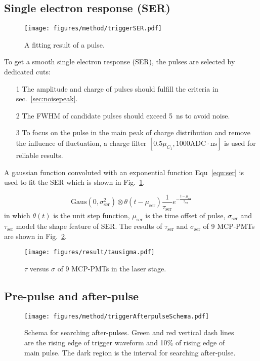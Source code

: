 \subsection{Single electron response (SER)}
\begin{figure}
    \centering
    \texttt{[image: figures/method/triggerSER.pdf]}
    \caption{A fitting result of a pulse.}
    \label{fig:triggerser}
\end{figure}
To get a smooth single electron response (SER), the pulses are selected by dedicated cuts:
\begin{itemize}
    \item[1] The amplitude and charge of pulses should fulfill the criteria in sec.~\ref{sec:noisepeak}.
    \item[2] The FWHM of candidate pulses should exceed \SI{5}{ns} to avoid noise.
    \item[3] To focus on the pulse in the main peak of charge distribution and remove the influence of fluctuation, a charge filter $[0.5\mu_{C_1}, 1000\mathrm{ADC\cdot ns}]$ is used for reliable results.
\end{itemize}

A gaussian function convoluted with an exponential function Equ~\eqref{equ:ser} is used to fit the SER which is shown in Fig.~\ref{fig:triggerser}.

\begin{equation}
    \label{equ:ser}
    \mathrm{Gaus}(0,\sigma_{\mathrm{ser}}^2)\otimes\theta(t-\mu_{\mathrm{ser}})\frac{1}{\tau_{\mathrm{ser}}}e^{-\frac{t-\mu_{\mathrm{ser}}}{\tau_{\mathrm{ser}}}}
\end{equation}
in which $\theta(t)$ is the unit step function, $\mu_{\mathrm{ser}}$ is the time offset of pulse, $\sigma_{\mathrm{ser}}$ and $\tau_{\mathrm{ser}}$ model the shape feature of SER. The results of $\tau_{\mathrm{ser}}$ and $\sigma_{\mathrm{ser}}$ of 9 MCP-PMTs are shown in Fig.~\ref{fig:sigmaCompare}.
\begin{figure}[!htbp]
    \centering
    \texttt{[image: figures/result/tausigma.pdf]}
    \caption{$\tau$ versus $\sigma$ of 9 MCP-PMTs in the laser stage.}
    \label{fig:sigmaCompare}
\end{figure}


\subsection{Pre-pulse and after-pulse}

\begin{figure}
    \centering
    \texttt{[image: figures/method/triggerAfterpulseSchema.pdf]}
    \caption{Schema for searching after-pulses. Green and red vertical dash lines are the rising edge of trigger waveform and 10\% of rising edge of main pulse. The dark region is the interval for searching after-pulse.}
    \label{fig:afterpulseSchema}
\end{figure}

